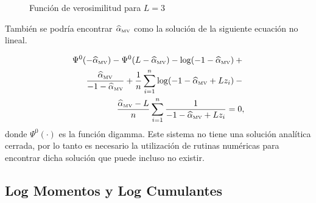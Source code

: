 \begin{figure}[hbt]
	\centering    
	 \qquad
	\caption{\label{MV} Función de verosimilitud para $L=3$}
\end{figure}

También se podría encontrar $\widehat{\alpha}_{{\text{\tiny{MV}}}}$ como la solución de la siguiente ecuación no lineal.

\begin{align}
\label{rootML}
\Psi^0(-\widehat{\alpha}_{{\text{\tiny{MV}}}})-\Psi^0(L-\widehat{\alpha}_{{\text{\tiny{MV}}}})-\log(-1-\widehat{\alpha}_{{\text{\tiny{MV}}}})+{} \nonumber\\
\frac{\widehat{\alpha}_{{\text{\tiny{MV}}}}}{-1-\widehat{\alpha}_{{\text{\tiny{MV}}}}}+
\frac{1}{n}\sum_{i=1}^n{\log(-1-\widehat{\alpha}_{{\text{\tiny{MV}}}}+Lz_i)}-{}
\nonumber
\\ \frac{\widehat{\alpha}_{{\text{\tiny{MV}}}}-L}{n}\sum_{i=1}^n \frac1{-1-\widehat{\alpha}_{{\text{\tiny{MV}}}}+Lz_i}= 0, 
\end{align}
donde $\Psi^0(\cdot)$ es la función digamma. Este sistema no tiene una solución analítica cerrada, por lo tanto es necesario la utilización de rutinas numéricas para encontrar dicha solución que puede incluso no existir.

\subsection{Log Momentos y Log Cumulantes}

